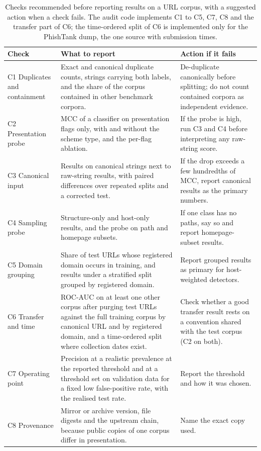\begin{table}[tp]
\centering
\caption{Checks recommended before reporting results on a URL corpus, with a suggested action when a check fails. The audit code implements C1 to C5, C7, C8 and the transfer part of C6; the time-ordered split of C6 is implemented only for the PhishTank dump, the one source with submission times.}
\label{tab:checklist}
\footnotesize
\begin{tabularx}{\linewidth}{@{}>{\raggedright\arraybackslash}p{2.7cm}>{\raggedright\arraybackslash}X>{\raggedright\arraybackslash}X@{}}
\toprule
Check & What to report & Action if it fails \\
\midrule
C1 Duplicates and containment & Exact and canonical duplicate counts, strings carrying both labels, and the share of the corpus contained in other benchmark corpora. & De-duplicate canonically before splitting; do not count contained corpora as independent evidence. \\
C2 Presentation probe & MCC of a classifier on presentation flags only, with and without the scheme type, and the per-flag ablation. & If the probe is high, run C3 and C4 before interpreting any raw-string score. \\
C3 Canonical input & Results on canonical strings next to raw-string results, with paired differences over repeated splits and a corrected test. & If the drop exceeds a few hundredths of MCC, report canonical results as the primary numbers. \\
C4 Sampling probe & Structure-only and host-only results, and the probe on path and homepage subsets. & If one class has no paths, say so and report homepage-subset results. \\
C5 Domain grouping & Share of test URLs whose registered domain occurs in training, and results under a stratified split grouped by registered domain. & Report grouped results as primary for host-weighted detectors. \\
C6 Transfer and time & ROC-AUC on at least one other corpus after purging test URLs against the full training corpus by canonical URL and by registered domain, and a time-ordered split where collection dates exist. & Check whether a good transfer result rests on a convention shared with the test corpus (C2 on both). \\
C7 Operating point & Precision at a realistic prevalence at the reported threshold and at a threshold set on validation data for a fixed low false-positive rate, with the realised test rate. & Report the threshold and how it was chosen. \\
C8 Provenance & Mirror or archive version, file digests and the upstream chain, because public copies of one corpus differ in presentation. & Name the exact copy used. \\
\bottomrule
\end{tabularx}
\end{table}

